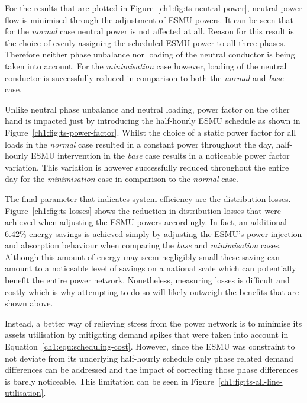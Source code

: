 For the results that are plotted in Figure~\ref{ch1:fig:ts-neutral-power}, neutral power flow is minimised through the adjustment of ESMU powers.
It can be seen that for the \textit{normal} case neutral power is not affected at all.
Reason for this result is the choice of evenly assigning the scheduled ESMU power to all three phases.
Therefore neither phase unbalance nor loading of the neutral conductor is being taken into account.
For the \textit{minimisation} case however, loading of the neutral conductor is successfully reduced in comparison to both the \textit{normal} and \textit{base} case.



Unlike neutral phase unbalance and neutral loading, power factor on the other hand is impacted just by introducing the half-hourly ESMU schedule as shown in Figure~\ref{ch1:fig:ts-power-factor}.
Whilst the choice of a static power factor for all loads in the \textit{normal} case resulted in a constant power throughout the day, half-hourly ESMU intervention in the \textit{base} case results in a noticeable power factor variation.
This variation is however successfully reduced throughout the entire day for the \textit{minimisation} case in comparison to the \textit{normal} case.



The final parameter that indicates system efficiency are the distribution losses.
Figure~\ref{ch1:fig:ts-losses} shows the reduction in distribution losses that were achieved when adjusting the ESMU powers accordingly.
In fact, an additional 6.42\% energy savings is achieved simply by adjusting the ESMU's power injection and absorption behaviour when comparing the \textit{base} and \textit{minimisation} cases.
Although this amount of energy may seem negligibly small these saving can amount to a noticeable level of savings on a national scale which can potentially benefit the entire power network.
Nonetheless, measuring losses is difficult and costly which is why attempting to do so will likely outweigh the benefits that are shown above.

Instead, a better way of relieving stress from the power network is to minimise its assets utilisation by mitigating demand spikes that were taken into account in Equation~\ref{ch1:equ:scheduling-cost}.
However, since the ESMU was constraint to not deviate from its underlying half-hourly schedule only phase related demand differences can be addressed and the impact of correcting those phase differences is barely noticeable.
This limitation can be seen in Figure~\ref{ch1:fig:ts-all-line-utilisation}.

